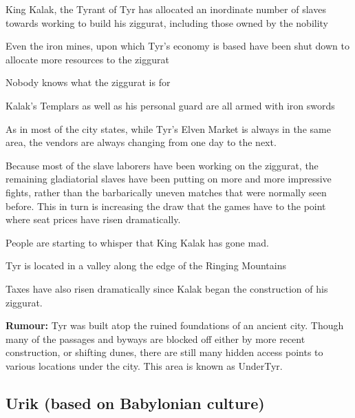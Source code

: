 \begin{multicols}{2}
\begin{description}
    \item King Kalak, the Tyrant of Tyr has allocated an inordinate number of slaves towards working to build his ziggurat, including those owned by the nobility
    \item Even the iron mines, upon which Tyr’s economy is based have been shut down to allocate more resources to the ziggurat
    \item Nobody knows what the ziggurat is for
    \item Kalak’s Templars as well as his personal guard are all armed with iron swords
    \item As in most of the city states, while Tyr’s Elven Market is always in the same area, the vendors are always changing from one day to the next.
    \item Because most of the slave laborers have been working on the ziggurat, the remaining gladiatorial slaves have been putting on more and more impressive fights, rather than the barbarically uneven matches that were normally seen before. This in turn is increasing the draw that the games have to the point where seat prices have risen dramatically.
    \item People are starting to whisper that King Kalak has gone mad.
    \item Tyr is located in a valley along the edge of the Ringing Mountains
    \item Taxes have also risen dramatically since Kalak began the construction of his ziggurat.
    \item \textbf{Rumour:} Tyr was built atop the ruined foundations of an ancient city. Though many of the passages and byways are blocked off either by more recent construction, or shifting dunes, there are still many hidden access points to various locations under the city. This area is known as UnderTyr.
\end{description}

\subsection{Urik (based on Babylonian culture)}


\end{multicols}
